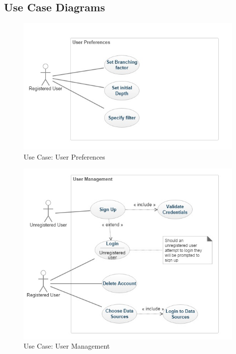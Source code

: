 \documentclass[hidelinks,english]{article}
\begin{document}
		\subsection{Use Case Diagrams}
		
		
		\begin{figure}
		\includegraphics[width=\linewidth]{User Preferences.jpg}
		\caption{Use Case: User Preferences}
		\end{figure}
		\begin{figure}
			\includegraphics[width=\linewidth]{UserManagement.jpg}
			\caption{Use Case: User Management}
		\end{figure}
\end{document}
